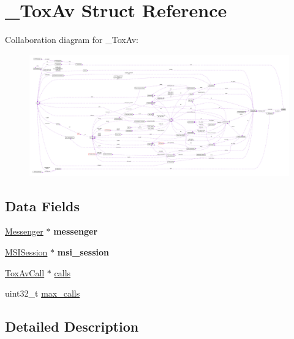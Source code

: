\hypertarget{struct___tox_av}{\section{\+\_\+\+Tox\+Av Struct Reference}
\label{struct___tox_av}
}


Collaboration diagram for \+\_\+\+Tox\+Av\+:\nopagebreak
\begin{figure}[H]
\begin{center}
\leavevmode
\includegraphics[width=350pt]{struct___tox_av__coll__graph}
\end{center}
\end{figure}
\subsection*{Data Fields}
\begin{DoxyCompactItemize}
\item 
\hypertarget{struct___tox_av_a48342badc24a04d2310ca16ff4a3711b}{\hyperlink{struct_messenger}{Messenger} $\ast$ {\bfseries messenger}}\label{struct___tox_av_a48342badc24a04d2310ca16ff4a3711b}

\item 
\hypertarget{struct___tox_av_a85e3d7dd2ab722ee5ba0cd4b72bc7d60}{\hyperlink{struct___m_s_i_session}{M\+S\+I\+Session} $\ast$ {\bfseries msi\+\_\+session}}\label{struct___tox_av_a85e3d7dd2ab722ee5ba0cd4b72bc7d60}

\item 
\hyperlink{struct___tox_av_call}{Tox\+Av\+Call} $\ast$ \hyperlink{struct___tox_av_abe854f89ac28ebd5112d1639d531b128}{calls}
\item 
uint32\+\_\+t \hyperlink{struct___tox_av_a7d6cf32eb812384ebd4074c588c17499}{max\+\_\+calls}
\end{DoxyCompactItemize}


\subsection{Detailed Description}


